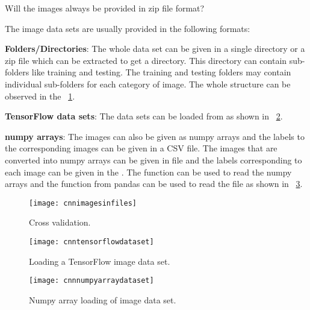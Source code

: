 	\begin{qanda}
		\begin{question}
Will the images always be provided in zip file format?
		\end{question}
		\begin{answer}
The image data sets are usually provided in the following formats:

	\begin{bulletedlist}
		\item {\bfseries Folders/Directories}: The whole data set can be given in a single directory or a zip file which can be extracted to get a directory. This directory can contain sub-folders like training and testing. The training and testing folders may contain individual sub-folders for each category of image. The whole structure can be observed in the \figurename~\ref{fig:cnnimagesinfiles}.
		\item {\bfseries TensorFlow data sets}: The data sets can be loaded from as shown in \figurename~\ref{fig:cnntensorflowdataset}.
		\item {\bfseries numpy arrays}: The images can also be given as numpy arrays and the labels to the corresponding images can be given in a CSV file.  The images that are converted into numpy arrays can be given in  file and the labels corresponding to each image can be given in the .  The  function can be used to read the numpy arrays and the  function from pandas can be used to read the  file as shown in \figurename~\ref{fig:cnnnumpyarraydataset}.
	\end{bulletedlist}
		\end{answer}
	\end{qanda}

	\begin{figure}[htb]
		\centering
		\texttt{[image: cnnimagesinfiles]}
		\caption[Cross validation]{Cross validation.}
		\label{fig:cnnimagesinfiles}
	\end{figure}

	\begin{figure}[htb]
		\centering
		\texttt{[image: cnntensorflowdataset]}
		\caption[Loading a TensorFlow image data set]{Loading a TensorFlow image data set.}
		\label{fig:cnntensorflowdataset}
	\end{figure}

	\begin{figure}[htb]
		\centering
		\texttt{[image: cnnnumpyarraydataset]}
		\caption[Numpy array loading of image data set]{Numpy array loading of image data set.}
		\label{fig:cnnnumpyarraydataset}
	\end{figure}

